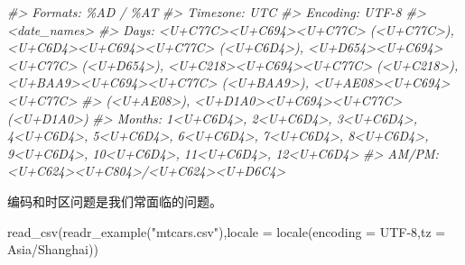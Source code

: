 \documentclass[
]{book}
\newenvironment{Shaded}{\begin{snugshade}}{\end{snugshade}}
\newcommand{\AttributeTok}[1]{\textcolor[rgb]{0.77,0.63,0.00}{#1}}
\newcommand{\CommentTok}[1]{\textcolor[rgb]{0.56,0.35,0.01}{\textit{#1}}}
\newcommand{\FunctionTok}[1]{\textcolor[rgb]{0.00,0.00,0.00}{#1}}
\newcommand{\NormalTok}[1]{#1}
\newcommand{\StringTok}[1]{\textcolor[rgb]{0.31,0.60,0.02}{#1}}
\begin{document}
\begin{Shaded}
\begin{Highlighting}[]
\CommentTok{\#\textgreater{} Formats:  \%AD / \%AT}
\CommentTok{\#\textgreater{} Timezone: UTC}
\CommentTok{\#\textgreater{} Encoding: UTF{-}8}
\CommentTok{\#\textgreater{} \textless{}date\_names\textgreater{}}
\CommentTok{\#\textgreater{} Days:   \textless{}U+C77C\textgreater{}\textless{}U+C694\textgreater{}\textless{}U+C77C\textgreater{} (\textless{}U+C77C\textgreater{}), \textless{}U+C6D4\textgreater{}\textless{}U+C694\textgreater{}\textless{}U+C77C\textgreater{} (\textless{}U+C6D4\textgreater{}), \textless{}U+D654\textgreater{}\textless{}U+C694\textgreater{}\textless{}U+C77C\textgreater{} (\textless{}U+D654\textgreater{}), \textless{}U+C218\textgreater{}\textless{}U+C694\textgreater{}\textless{}U+C77C\textgreater{} (\textless{}U+C218\textgreater{}), \textless{}U+BAA9\textgreater{}\textless{}U+C694\textgreater{}\textless{}U+C77C\textgreater{} (\textless{}U+BAA9\textgreater{}), \textless{}U+AE08\textgreater{}\textless{}U+C694\textgreater{}\textless{}U+C77C\textgreater{}}
\CommentTok{\#\textgreater{}         (\textless{}U+AE08\textgreater{}), \textless{}U+D1A0\textgreater{}\textless{}U+C694\textgreater{}\textless{}U+C77C\textgreater{} (\textless{}U+D1A0\textgreater{})}
\CommentTok{\#\textgreater{} Months: 1\textless{}U+C6D4\textgreater{}, 2\textless{}U+C6D4\textgreater{}, 3\textless{}U+C6D4\textgreater{}, 4\textless{}U+C6D4\textgreater{}, 5\textless{}U+C6D4\textgreater{}, 6\textless{}U+C6D4\textgreater{}, 7\textless{}U+C6D4\textgreater{}, 8\textless{}U+C6D4\textgreater{}, 9\textless{}U+C6D4\textgreater{}, 10\textless{}U+C6D4\textgreater{}, 11\textless{}U+C6D4\textgreater{}, 12\textless{}U+C6D4\textgreater{}}
\CommentTok{\#\textgreater{} AM/PM:  \textless{}U+C624\textgreater{}\textless{}U+C804\textgreater{}/\textless{}U+C624\textgreater{}\textless{}U+D6C4\textgreater{}}
\end{Highlighting}
\end{Shaded}

编码和时区问题是我们常面临的问题。

\begin{Shaded}
\begin{Highlighting}[]
\FunctionTok{read\_csv}\NormalTok{(}\FunctionTok{readr\_example}\NormalTok{(}\StringTok{"mtcars.csv"}\NormalTok{),}\AttributeTok{locale =} \FunctionTok{locale}\NormalTok{(}\AttributeTok{encoding =} \StringTok{\textquotesingle{}UTF{-}8\textquotesingle{}}\NormalTok{,}\AttributeTok{tz =} \StringTok{\textquotesingle{}Asia/Shanghai\textquotesingle{}}\NormalTok{))}
\end{Highlighting}
\end{Shaded}
\end{document}
